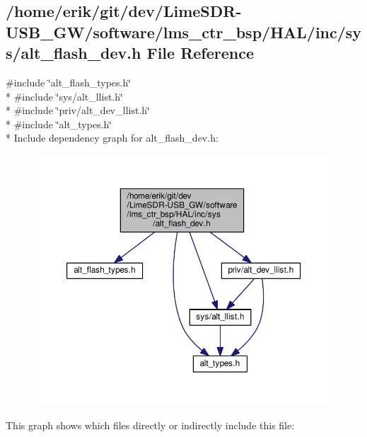 \subsection{/home/erik/git/dev/\+Lime\+S\+D\+R-\/\+U\+S\+B\+\_\+\+G\+W/software/lms\+\_\+ctr\+\_\+bsp/\+H\+A\+L/inc/sys/alt\+\_\+flash\+\_\+dev.h File Reference}
\label{alt__flash__dev_8h}
{\ttfamily \#include \char`\"{}alt\+\_\+flash\+\_\+types.\+h\char`\"{}}\\*
{\ttfamily \#include \char`\"{}sys/alt\+\_\+llist.\+h\char`\"{}}\\*
{\ttfamily \#include \char`\"{}priv/alt\+\_\+dev\+\_\+llist.\+h\char`\"{}}\\*
{\ttfamily \#include \char`\"{}alt\+\_\+types.\+h\char`\"{}}\\*
Include dependency graph for alt\+\_\+flash\+\_\+dev.\+h\+:
\nopagebreak
\begin{figure}[H]
\begin{center}
\leavevmode
\includegraphics[width=350pt]{d6/db8/alt__flash__dev_8h__incl}
\end{center}
\end{figure}
This graph shows which files directly or indirectly include this file\+:
\nopagebreak
